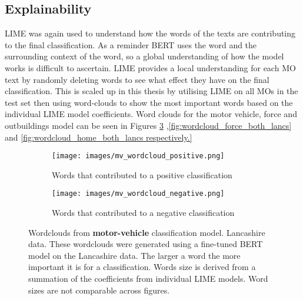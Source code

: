 \subsection{Explainability} LIME was again used to understand how the words of the texts are contributing to the final classification. As a reminder BERT uses the word and the surrounding context of the word, so a global understanding of how the model works is difficult to ascertain. LIME provides a local understanding for each MO text by randomly deleting words to see what effect they have on the final classification. This is scaled up in this thesis by utilising LIME on all MOs in the test set then using word-clouds to show the most important words based on the individual LIME model coefficients. Word clouds for the motor vehicle, force and outbuildings model can be seen in Figures \ref{fig:wordcloud_mv_both_lancs} ,\ref{fig:wordcloud_force_both_lancs} and \ref{fig:wordcloud_home_both_lancs respectively.}

\begin{figure}
     \centering
     \begin{subfigure}[b]{0.9\textwidth}
         \centering
         \texttt{[image: images/mv\_wordcloud\_positive.png]}
         \caption{Words that contributed to a positive classification}
         \label{fig: wordcloud_mv_lancs}
     \end{subfigure}
     \vfill
     \begin{subfigure}[b]{0.9\textwidth}
         \centering
         \texttt{[image: images/mv\_wordcloud\_negative.png]}
         \caption{Words that contributed to a negative classification}
         \label{fig: wordcloud_mv_rev_lancs}
     \end{subfigure}
        \caption[Wordclouds from  \textbf{motor-vehicle} classification model. Lancashire data.]{{Wordclouds from  \textbf{motor-vehicle} classification model. Lancashire data.} These wordclouds were generated using a fine-tuned BERT model on the Lancashire data. The larger a word the more important it is for a classification. Words size is derived from a summation of the coefficients from individual LIME models. Word sizes are not comparable across figures.}
        \label{fig:wordcloud_mv_both_lancs}
        
\end{figure}


